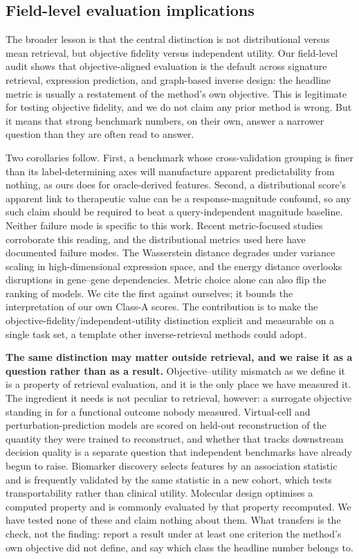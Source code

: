 \documentclass[11pt,letterpaper]{article}
\begin{document}
\subsection*{Field-level evaluation implications}

The broader lesson is that the central distinction is not distributional versus mean retrieval, but
objective fidelity versus independent utility. Our field-level audit shows that
objective-aligned evaluation is the default across signature retrieval, expression
prediction, and graph-based inverse design: the headline metric is usually a restatement of
the method's own objective. This is legitimate for testing objective fidelity, and we do not
claim any prior method is wrong. But it means that strong benchmark numbers, on their own,
answer a narrower question than they are often read to answer.

Two corollaries follow. First, a benchmark whose cross-validation grouping is finer than its
label-determining axes will manufacture apparent predictability from nothing, as ours does for
oracle-derived features\cite{Leakage,PseudoRep}. Second, a distributional score's apparent link to
therapeutic value can be a response-magnitude confound, so any such claim should be required to beat
a query-independent magnitude baseline. Neither failure mode is specific to this work. Recent metric-focused studies corroborate this
reading, and the distributional metrics used here have documented failure modes. The Wasserstein
distance degrades under variance scaling in high-dimensional expression space, and the energy
distance overlooks disruptions in gene--gene dependencies\cite{ref16}. Metric choice alone can also
flip the ranking of models\cite{ref17}. We cite the first against ourselves; it bounds the
interpretation of our own Class-A scores. The contribution is to make the
objective-fidelity/independent-utility distinction explicit and measurable on a single task set, a
template other inverse-retrieval methods could adopt.

\textbf{The same distinction may matter outside retrieval, and we raise it as a question rather
than as a result.} Objective--utility mismatch as we define it is a property of retrieval
evaluation, and it is the only place we have measured it. The ingredient it needs is not peculiar
to retrieval, however: a surrogate objective standing in for a functional outcome nobody measured.
Virtual-cell and perturbation-prediction models are scored on held-out reconstruction of the
quantity they were trained to reconstruct, and whether that tracks downstream decision quality is
a separate question that independent benchmarks have already begun to
raise\cite{ref13,ref14,VirtualCellChallenge}. Biomarker discovery selects features by an
association statistic and is frequently validated by the same statistic in a new cohort, which
tests transportability rather than clinical utility. Molecular design optimises a computed
property and is commonly evaluated by that property recomputed. We have tested none of these and
claim nothing about them. What transfers is the check, not the finding: report a result under at
least one criterion the method's own objective did not define, and say which class the headline
number belongs to.
\end{document}
